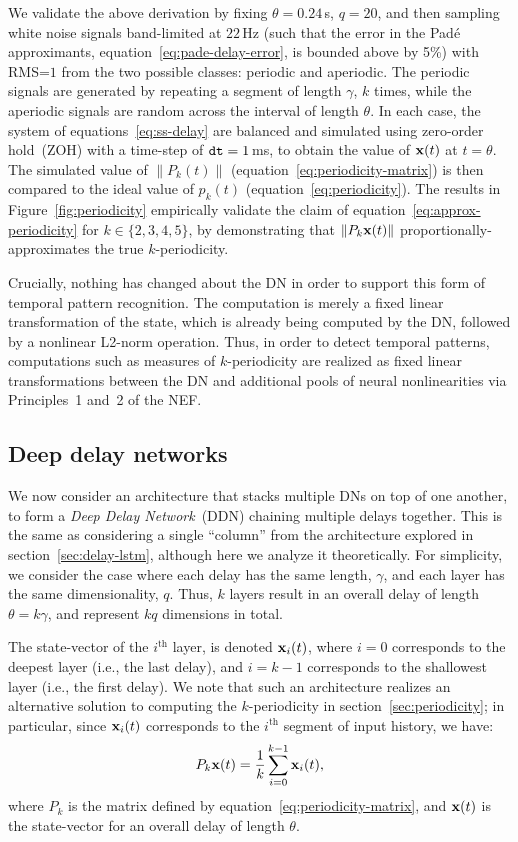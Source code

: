 We validate the above derivation by fixing $\theta=0.24$\,s, $q=20$, and then sampling white noise signals band-limited at $22$\,Hz (such that the error in the Pad\'e approximants, equation~\ref{eq:pade-delay-error}, is bounded above by 5\%) with RMS=$1$ from the two possible classes: periodic and aperiodic.
The periodic signals are generated by repeating a segment of length $\gamma$, $k$ times, while the aperiodic signals are random across the interval of length $\theta$.
In each case, the system of equations~\ref{eq:ss-delay} are balanced and simulated using zero-order hold~(ZOH) with a time-step of $\texttt{dt}{} = 1$\,ms, to obtain the value of $\mathbf{x}(t)$ at $t = \theta$.
The simulated value of $\| P_k(t) \|$ (equation~\ref{eq:periodicity-matrix}) is then compared to the ideal value of $p_k(t)$ (equation~\ref{eq:periodicity}).
The results in Figure~\ref{fig:periodicity} empirically validate the claim of equation~\ref{eq:approx-periodicity} for $k \in \{2, 3, 4, 5\}$, by demonstrating that $\|P_k \mathbf{x}(t) \|$ proportionally-approximates the true $k$-periodicity.

Crucially, nothing has changed about the DN in order to support this form of temporal pattern recognition.
The computation is merely a fixed linear transformation of the state, which is already being computed by the DN, followed by a nonlinear L2-norm operation.
Thus, in order to detect temporal patterns, computations such as measures of $k$-periodicity are realized as fixed linear transformations between the DN and additional pools of neural nonlinearities via Principles~1 and~2 of the NEF.

\subsection{Deep delay networks}
\label{sec:deep-delay-networks}

We now consider an architecture that stacks multiple DNs on top of one another, to form a \emph{Deep Delay Network}~(DDN) chaining multiple delays together.
This is the same as considering a single ``column'' from the architecture explored in section~\ref{sec:delay-lstm}, although here we analyze it theoretically.
For simplicity, we consider the case where each delay has the same length, $\gamma$, and each layer has the same dimensionality, $q$.
Thus, $k$ layers result in an overall delay of length $\theta = k \gamma$, and represent $k q$ dimensions in total.

The state-vector of the $i^\text{th}$ layer, is denoted $\mathbf{x}_i(t)$, where $i=0$ corresponds to the deepest layer (i.e., the last delay), and $i=k-1$ corresponds to the shallowest layer (i.e., the first delay).
We note that such an architecture realizes an alternative solution to computing the $k$-periodicity in section~\ref{sec:periodicity}; in particular, since $\mathbf{x}_i(t)$ corresponds to the $i^\text{th}$ segment of input history, we have:
\begin{equation*}
P_k \mathbf{x}(t) = \frac{1}{k} \sum_{i=0}^{k-1} \mathbf{x}_i(t) \text{,}
\end{equation*}
where $P_k$ is the matrix defined by equation~\ref{eq:periodicity-matrix}, and $\mathbf{x}(t)$ is the state-vector for an overall delay of length $\theta$.

